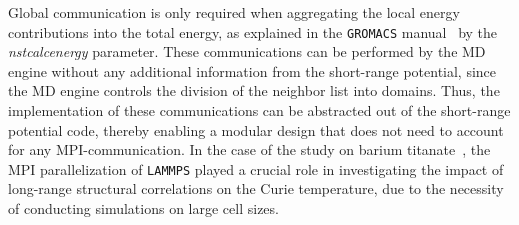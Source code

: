 Global communication is only required when aggregating the local energy contributions into the total energy, as explained in the \texttt{GROMACS} manual~\cite{gromacsnstcalcenergy} by the \emph{nstcalcenergy} parameter.
These communications can be performed by the MD engine without any additional information from the short-range potential, since the MD engine controls the division of the neighbor list into domains.
Thus, the implementation of these communications can be abstracted out of the short-range potential code, thereby enabling a modular design that does not need to account for any MPI-communication.
In the case of the study on barium titanate~\cite{gigli2023modeling}, the MPI parallelization of \texttt{LAMMPS} played a crucial role in investigating the impact of long-range structural correlations on the Curie temperature, due to the necessity of conducting simulations on large cell sizes.
